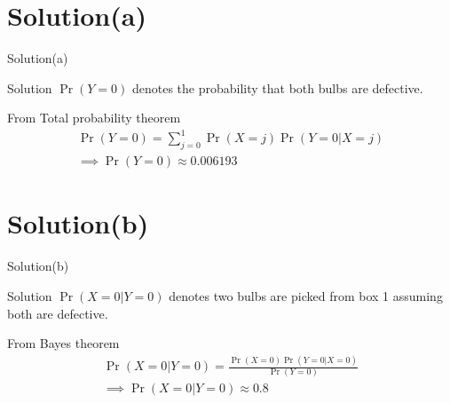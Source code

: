\documentclass{beamer}
\providecommand{\pr}[1]{\ensuremath{\Pr\left(#1\right)}}
\begin{document}
\section{Solution(a)}
     \begin{frame}{Solution(a)}
     \begin{block}{Solution}
     $\pr{Y=0}$ denotes the probability that both bulbs are defective.\\
     \end{block}
      From Total probability theorem
        \begin{align}
            \pr{Y=0}=\sum_{j=0}^1\pr{X=j}\pr{Y=0|X=j}\\
            \implies \boxed{\pr{Y=0}\approx 0.006193}
        \end{align}
     \end{frame}
     
     
     \section{Solution(b)}
     \begin{frame}{Solution(b)}
     \begin{block}{Solution}
     $\pr{X=0|Y=0}$ denotes two bulbs are picked from box 1 assuming both are defective.
     \end{block}
     From Bayes theorem
        \begin{align}
            \pr{X=0|Y=0}=\frac{\pr{X=0}\pr{Y=0|X=0}}{\pr{Y=0}}\\
            \implies \boxed{\pr{X=0|Y=0}\approx0.8}
        \end{align}
     \end{frame}
\end{document}
